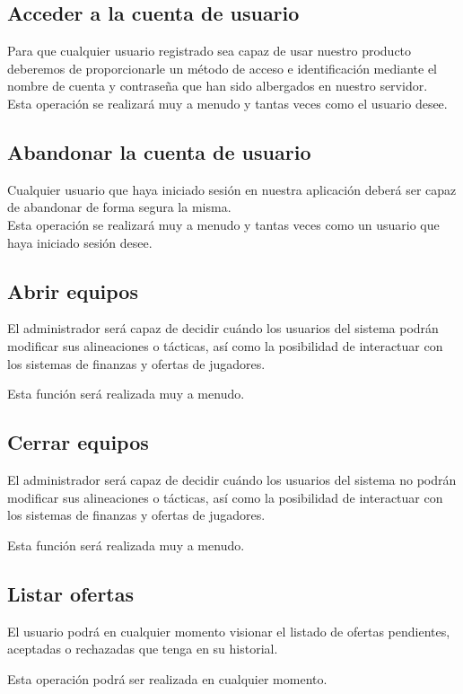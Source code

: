 \subsection{Acceder a la cuenta de usuario}
Para que cualquier usuario registrado sea capaz de usar nuestro
producto deberemos de proporcionarle un método de acceso e
identificación mediante el nombre de cuenta y contraseña que han sido
albergados en nuestro servidor.\\

Esta operación se realizará muy a menudo y tantas veces como el
usuario desee.
\subsection{Abandonar la cuenta de usuario}
Cualquier usuario que haya iniciado sesión en nuestra aplicación
deberá ser capaz de abandonar de forma segura la misma.\\

Esta operación se realizará muy a menudo y tantas veces como un
usuario que haya iniciado sesión desee.

\subsection{Abrir equipos}
El administrador será capaz de decidir cuándo los usuarios del sistema
podrán modificar sus alineaciones o tácticas, así como la posibilidad
de interactuar con los sistemas de finanzas y ofertas de jugadores.

Esta función será realizada muy a menudo.

\subsection{Cerrar equipos}
El administrador será capaz de decidir cuándo los usuarios del sistema
no podrán modificar sus alineaciones o tácticas, así como la
posibilidad de interactuar con los sistemas de finanzas y ofertas de jugadores.

Esta función será realizada muy a menudo.

\subsection{Listar ofertas}
El usuario podrá en cualquier momento visionar el listado de ofertas
pendientes, aceptadas o rechazadas que tenga en su historial.

Esta operación podrá ser realizada en cualquier momento.

